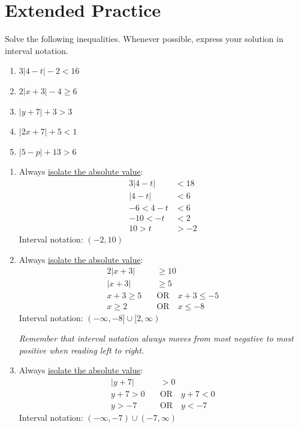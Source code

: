 \documentclass{ximera}
\begin{document}
\bigskip
\section*{Extended Practice}

\begin{problem}
Solve the following inequalities. Whenever possible, express your solution in interval notation.
\begin{enumerate}
  \item[(a)] $3|4-t| - 2 < 16$
  \medskip
  \item[(b)] $2|x+3| - 4 \geq 6$
  \medskip
  \item[(c)] $|y+7| + 3 > 3$
  \medskip
  \item[(d)] $|2x+7| + 5 < 1$
  \medskip
  \item[(e)] $|5-p| + 13 > 6$
\end{enumerate}

\begin{solution}
\begin{enumerate}
  \item[(a)] Always \underline{isolate the absolute value}:
  \begin{align*}
    3|4-t| &< 18\\
    |4-t| &< 6\\
    -6 < 4-t &< 6\\
    -10 < -t &< 2\\
    10 > t &> -2
  \end{align*}
  Interval notation: $(-2,10)$

  \item[(b)] Always \underline{isolate the absolute value}:
  \begin{align*}
    2|x+3| &\geq 10\\
    |x+3| &\geq 5\\
    x+3 \geq 5 \quad &\text{OR}\quad x+3 \leq -5\\
    x \geq 2 \quad &\text{OR}\quad x \leq -8
  \end{align*}
  Interval notation: $(-\infty,-8] \cup [2,\infty)$

  \textit{Remember that interval notation always moves from most negative to most positive when reading left to right.}

  \item[(c)] Always \underline{isolate the absolute value}:
  \begin{align*}
    |y+7| &> 0\\
    y+7 > 0 \quad &\text{OR}\quad y+7 < 0\\
    y > -7 \quad &\text{OR}\quad y < -7
  \end{align*}
  Interval notation: $(-\infty,-7) \cup (-7,\infty)$


\end{enumerate}
\end{solution}
\end{problem}
\end{document}
